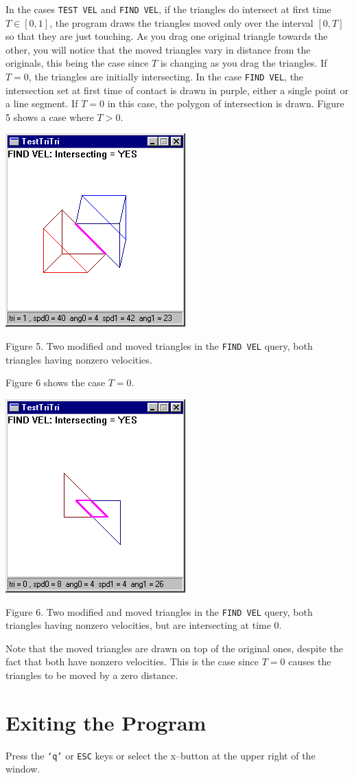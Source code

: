 \documentclass{article}
\newcommand{\Code}[1]{{\tt #1}}
\begin{document}
In the cases \Code{TEST VEL} and \Code{FIND VEL}, if the triangles do
intersect at first time $T \in [0,1]$, the program draws the triangles moved
only over the interval $[0,T]$ so that they are just touching.  As you drag
one original triangle towards the other, you will notice that the moved
triangles vary in distance from the originals, this being the case since $T$
is changing as you drag the triangles.  If $T = 0$, the triangles are
initially intersecting.  In the case \Code{FIND VEL}, the intersection set at
first time of contact is drawn in purple, either a single point or a line
segment.  If $T = 0$ in this case, the polygon of intersection is drawn.
Figure 5 shows a case where $T > 0$.
%
%
\begin{center}
  \includegraphics{Figure5.png}

  Figure 5.  Two modified and moved triangles in the \Code{FIND VEL} query,
  both triangles having nonzero velocities.
\end{center}
%
Figure 6 shows the case $T = 0$.
%
%
\begin{center}
  \includegraphics{Figure6.png}

  Figure 6.  Two modified and moved triangles in the \Code{FIND VEL} query,
  both triangles having nonzero velocities, but are intersecting at time $0$.
\end{center}
%
Note that the moved triangles are drawn on top of the original ones, despite
the fact that both have nonzero velocities.  This is the case since $T = 0$
causes the triangles to be moved by a zero distance.

\section{Exiting the Program}

Press the \Code{`q'} or \Code{ESC} keys or select the x--button at the upper
right of the window.
\end{document}
